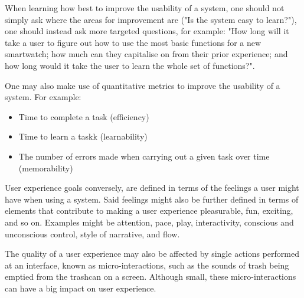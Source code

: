 When learning how best to improve the usability of a system, one should not simply ask where the areas for improvement
are ("Is the system easy to learn?"), one should instead ask more targeted questions, for example: "How long will it take a user to figure out how to use the most basic functions for a new smartwatch; how much can they capitalise on from
their prior experience; and how long would it take the user to learn the whole set of functions?".

One may also make use of quantitative metrics to improve the usability of a system. For example:
\begin{itemize}
	\item Time to complete a task (efficiency)
	\item Time to learn a taskk (learnability)
	\item The number of errors made when carrying out a given task over time (memorability)
\end{itemize}

User experience goals conversely, are defined in terms of the feelings a user might have when using a system. Said
feelings might also be further defined in terms of elements that contribute to making a user experience pleasurable,
fun, exciting, and so on. Examples might be attention, pace, play, interactivity, conscious and unconscious control,
style of narrative, and flow.

The quality of a user experience may also be affected by single actions performed at an interface, known as 
micro-interactions, such as the sounds of trash being emptied from the trashcan on a screen. Although small, these 
micro-interactions can have a big impact on user experience.

